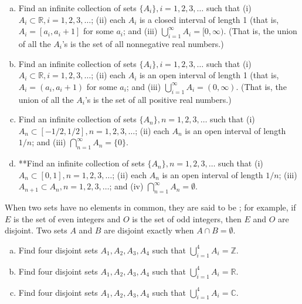 \begin{exercise}{15}
\begin{enumerate}[(a)]
\item
Find an infinite collection of sets $\{A_i\}, i = 1,2,3,\ldots$ such that (i) $A_i \subset {\mathbb R}, i = 1,2,3, \dots$; (ii)
 each $A_i$ is a closed  interval of length 1 (that is, $A_i = [a_i, a_i+1]$ for some $a_i$; and (iii) $\bigcup_{i = 1}^{\infty} A_{i} = [0, \infty)$. (That is, the union of all the $A_i$'s is the set of all nonnegative real numbers.)
\item
Find an infinite collection of sets $\{A_i\}, i = 1,2,3,\ldots$ such that (i) $A_i \subset {\mathbb R}, i = 1,2,3, \dots$; (ii)
 each $A_i$ is an open  interval of length 1 (that is, $A_i = (a_i, a_i+1)$ for some $a_i$; and (iii) $\bigcup_{i = 1}^{\infty} A_{i} = (0, \infty)$. (That is, the union of all the $A_i$'s is the set of all positive real numbers.)
\item
Find an infinite collection of sets $\{A_n\}, n = 1,2,3,\ldots$ such that (i) $A_n \subset  [-1/2,1/2], n = 1,2,3, \dots$; (ii)
 each $A_n$ is an open interval of length $1/n$; and (iii) $\bigcap_{n = 1}^{\infty} A_{n} = \{0\}$.
 \item
**Find an infinite collection of sets $\{A_n\}, n = 1,2,3,\ldots$ such that (i) $A_n \subset [0,1], n = 1,2,3, \dots$; (ii)
 each $A_n$ is an open interval of length $1/n$; (iii) $A_{n+1} \subset A_{n}, n = 1,2,3, \dots$; and (iv) $\bigcap_{n = 1}^{\infty} A_{n} = \emptyset$.
\end{enumerate}
\end{exercise}

When two sets have no elements in common, they are said to be ; for example, if $E$ is the set of even integers and $O$ is the set of odd integers, then $E$ and $O$ are disjoint.  Two sets $A$ and $B$ are disjoint exactly when $A \cap B = \emptyset$. 

\begin{exercise}{16}
\begin{enumerate}[(a)]
\item
Find four disjoint sets $A_1, A_2, A_3, A_4$ such that $\bigcup_{i = 1}^{4} A_i = {\mathbb Z}$.
\item
Find four disjoint sets $A_1, A_2, A_3, A_4$ such that $\bigcup_{i = 1}^{4} A_i = {\mathbb R}$.
\item
Find four disjoint sets $A_1, A_2, A_3, A_4$ such that $\bigcup_{i = 1}^{4} A_i = {\mathbb C}$.
\end{enumerate}
\end{exercise} 


